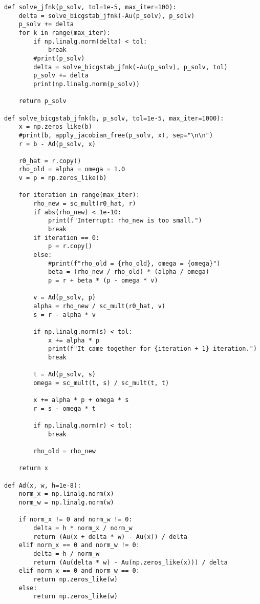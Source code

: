 \documentclass[12pt]{amsart}
\begin{document}
\begin{lstlisting}
def solve_jfnk(p_solv, tol=1e-5, max_iter=100):
    delta = solve_bicgstab_jfnk(-Au(p_solv), p_solv)
    p_solv += delta
    for k in range(max_iter):
        if np.linalg.norm(delta) < tol:
            break
        #print(p_solv)
        delta = solve_bicgstab_jfnk(-Au(p_solv), p_solv, tol)
        p_solv += delta
        print(np.linalg.norm(p_solv))

    return p_solv
    
def solve_bicgstab_jfnk(b, p_solv, tol=1e-5, max_iter=1000):
    x = np.zeros_like(b)
    #print(b, apply_jacobian_free(p_solv, x), sep="\n\n")
    r = b - Ad(p_solv, x)

    r0_hat = r.copy()
    rho_old = alpha = omega = 1.0
    v = p = np.zeros_like(b)

    for iteration in range(max_iter):
        rho_new = sc_mult(r0_hat, r)
        if abs(rho_new) < 1e-10:
            print(f"Interrupt: rho_new is too small.")
            break
        if iteration == 0:
            p = r.copy()
        else:
            #print(f"rho_old = {rho_old}, omega = {omega}")
            beta = (rho_new / rho_old) * (alpha / omega)
            p = r + beta * (p - omega * v)

        v = Ad(p_solv, p)
        alpha = rho_new / sc_mult(r0_hat, v)
        s = r - alpha * v   

        if np.linalg.norm(s) < tol:
            x += alpha * p
            print(f"It came together for {iteration + 1} iteration.")
            break

        t = Ad(p_solv, s)
        omega = sc_mult(t, s) / sc_mult(t, t)

        x += alpha * p + omega * s
        r = s - omega * t

        if np.linalg.norm(r) < tol:
            break

        rho_old = rho_new

    return x
    
def Ad(x, w, h=1e-8):
    norm_x = np.linalg.norm(x)
    norm_w = np.linalg.norm(w)

    if norm_x != 0 and norm_w != 0:
        delta = h * norm_x / norm_w
        return (Au(x + delta * w) - Au(x)) / delta
    elif norm_x == 0 and norm_w != 0:
        delta = h / norm_w
        return (Au(delta * w) - Au(np.zeros_like(x))) / delta
    elif norm_x == 0 and norm_w == 0:
        return np.zeros_like(w)
    else:
        return np.zeros_like(w)
\end{lstlisting} 
\end{document}
